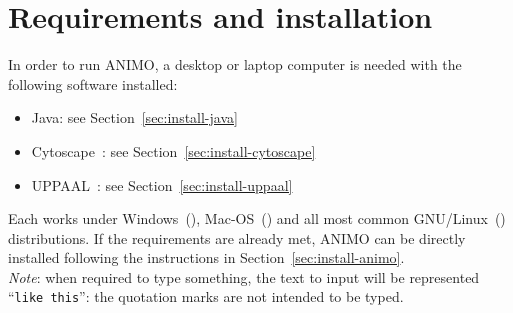 \makeatother




\thispagestyle{empty}
\tableofcontents
\clearpage

\setcounter{page}{1}
\setcounter{section}{0}

\renewcommand\figurename{Figure}
\renewcommand*\thefigure{S\arabic{figure}}
\renewcommand*\thetable{S\arabic{table}}

\def\ta{TA}
\def\tas{TA}




\section{Requirements and installation}\label{sec:animo-installation}
In order to run ANIMO, a desktop or laptop computer is needed with the following software installed:
\begin{itemize}
  \item Java: see Section~\ref{sec:install-java}
  \item Cytoscape~\citep{cytoscape}: see Section~\ref{sec:install-cytoscape}
  \item UPPAAL~\citep{uppaal}: see Section~\ref{sec:install-uppaal}
\end{itemize}
Each works under Windows~(\winsymbol), Mac-OS~(\macsymbol) and all most common GNU/Linux~(\linuxsymbol) distributions.
If the requirements are already met, ANIMO can be directly installed following the instructions in Section~\ref{sec:install-animo}.\\
\emph{Note}: when required to type something, the text to input will be represented ``{\tt like this}'': the quotation marks
are not intended to be typed.


